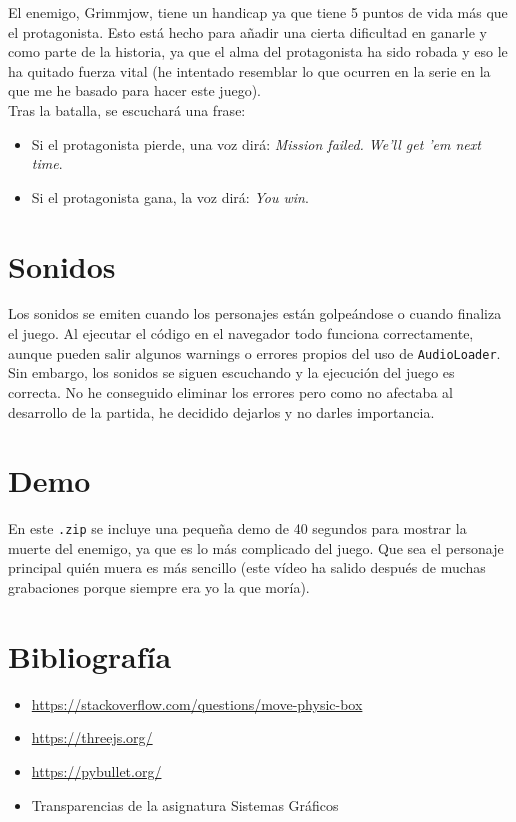 \documentclass[11pt,a4paper]{article}
\begin{document}
El enemigo, Grimmjow, tiene un handicap ya que tiene 5 puntos de vida más que el protagonista. Esto está hecho para añadir una cierta dificultad en ganarle y como parte de la historia, ya que el alma del protagonista ha sido robada y eso le ha quitado fuerza vital (he intentado resemblar lo que ocurren en la serie en la que me he basado para hacer este juego).\\

Tras la batalla, se escuchará una frase:

\begin{itemize}
	\item Si el protagonista pierde, una voz dirá: \textit{Mission failed. We'll get 'em next time}.
	\item Si el protagonista gana, la voz dirá: \textit{You win}.
\end{itemize}


\section{Sonidos}

Los sonidos se emiten cuando los personajes están golpeándose o cuando finaliza el juego. Al ejecutar el código en el navegador todo funciona correctamente, aunque pueden salir algunos warnings o errores propios del uso de \texttt{AudioLoader}.\\

Sin embargo, los sonidos se siguen escuchando y la ejecución del juego es correcta. No he conseguido eliminar los errores pero como no afectaba al desarrollo de la partida, he decidido dejarlos y no darles importancia.
\section{Demo}

En este \texttt{.zip} se incluye una pequeña demo de 40 segundos para mostrar la muerte del enemigo, ya que es lo más complicado del juego. Que sea el personaje principal quién muera es más sencillo (este vídeo ha salido después de muchas grabaciones porque siempre era yo la que moría).

\section{Bibliografía}

\begin{itemize}
	\item \color{blue}\href{https://stackoverflow.com/questions/34569703/raycaster-does-not-move-boxmesh-objects}{https://stackoverflow.com/questions/move-physic-box}\color{black}
	\item \color{blue}\href{https://threejs.org/}{https://threejs.org/}\color{black}
	\item \color{blue}\href{https://pybullet.org/Bullet/phpBB3/index.php?sid=0e8c6e5111583be0d17f1731e4c1dc19}{https://pybullet.org/}\color{black}
	\item Transparencias de la asignatura Sistemas Gráficos
\end{itemize}
\end{document}
